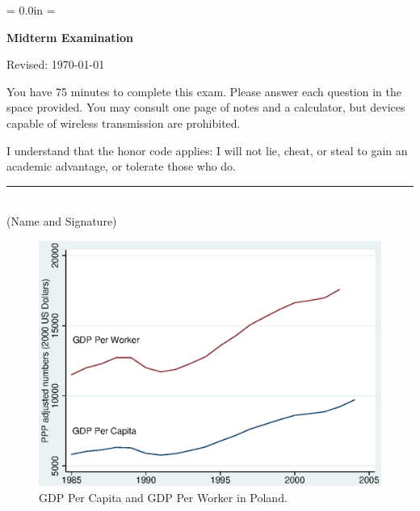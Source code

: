 \documentclass[letterpaper,12pt]{article}
\def\HeadName{Midterm Examination}
\begin{document}
\parindent = 0.0in
\parskip = \bigskipamount
\thispagestyle{empty}%
\Head

\centerline{\large \bf \HeadName}%
\centerline{Revised:  \today}

\bigskip
You have 75 minutes to complete this exam.  Please answer each
question in the space provided. You may consult one page of notes
and a calculator, but devices capable of wireless transmission are
prohibited.

I understand that the honor code applies: I will not lie, cheat,
or steal to gain an academic advantage, or tolerate those who do.

\begin{flushright}
\rule{4in}{0.5pt} \\ (Name and Signature)
\end{flushright}

\begin{figure}[h]
    \centering
    \includegraphics[scale=0.8]{pwtpolypopyl.eps}
    \caption{GDP Per Capita and GDP Per Worker in Poland.}
    \label{fig:poland}
\end{figure}
\end{document}
